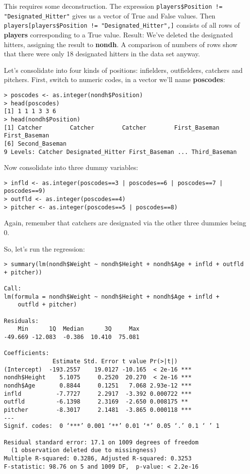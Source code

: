 This requires some deconstruction.  The expression
\lstinline{players$Position != "Designated_Hitter"} gives us a vector of
True and False values.  Then
\lstinline{players[players$Position != "Designated_Hitter",]} consists
of all rows of {\bf players} corresponding to a True value.  Result:
We've deleted the designated hitters, assigning the result to {\bf
nondh}.  A comparison of numbers of rows show that there were only 18
designated hitters in the data set anyway.

Let's consolidate into four kinds of positions:  infielders,
outfielders, catchers and pitchers.  First, switch to numeric codes, in
a vector we'll name {\bf poscodes}:

\begin{lstlisting}
> poscodes <- as.integer(nondh$Position)
> head(poscodes)
[1] 1 1 1 3 3 6
> head(nondh$Position)
[1] Catcher        Catcher        Catcher        First_Baseman  First_Baseman 
[6] Second_Baseman
9 Levels: Catcher Designated_Hitter First_Baseman ... Third_Baseman
\end{lstlisting}

Now consolidate into three dummy variables:

\begin{lstlisting}
> infld <- as.integer(poscodes==3 | poscodes==6 | poscodes==7 | poscodes==9)
> outfld <- as.integer(poscodes==4)
> pitcher <- as.integer(poscodes==5 | poscodes==8)
\end{lstlisting}

Again, remember that catchers are designated via the other three dummies
being 0.

So, let's run the regression:

\begin{verbatim}
> summary(lm(nondh$Weight ~ nondh$Height + nondh$Age + infld + outfld + pitcher))

Call:
lm(formula = nondh$Weight ~ nondh$Height + nondh$Age + infld + 
    outfld + pitcher)

Residuals:
    Min      1Q  Median      3Q     Max 
-49.669 -12.083  -0.386  10.410  75.081 

Coefficients:
              Estimate Std. Error t value Pr(>|t|)    
(Intercept)  -193.2557    19.0127 -10.165  < 2e-16 ***
nondh$Height    5.1075     0.2520  20.270  < 2e-16 ***
nondh$Age       0.8844     0.1251   7.068 2.93e-12 ***
infld          -7.7727     2.2917  -3.392 0.000722 ***
outfld         -6.1398     2.3169  -2.650 0.008175 ** 
pitcher        -8.3017     2.1481  -3.865 0.000118 ***
---
Signif. codes:  0 ‘***’ 0.001 ‘**’ 0.01 ‘*’ 0.05 ‘.’ 0.1 ‘ ’ 1 

Residual standard error: 17.1 on 1009 degrees of freedom
  (1 observation deleted due to missingness)
Multiple R-squared: 0.3286,	Adjusted R-squared: 0.3253 
F-statistic: 98.76 on 5 and 1009 DF,  p-value: < 2.2e-16 
\end{verbatim}

